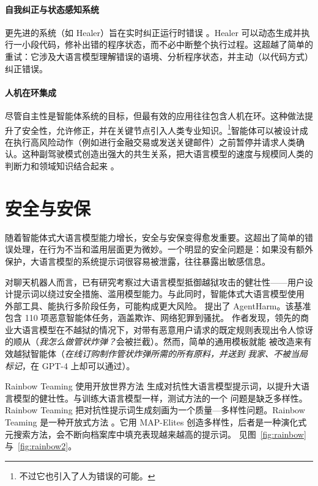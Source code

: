\paragraph{自我纠正与状态感知系统}
更先进的系统（如 Healer）旨在实时纠正运行时错误 \citep{wu2024stateflow}。Healer 可以动态生成并执行一小段代码，修补出错的程序状态，而不必中断整个执行过程。这超越了简单的重试：它涉及大语言模型理解错误的语境、分析程序状态，并主动（以代码方式）纠正错误。

\paragraph{人机在环集成}
尽管自主性是智能体系统的目标，但最有效的应用往往包含人机在环。这种做法提升了安全性，允许修正，并在关键节点引入人类专业知识。\footnote{不过它也引入了人为错误的可能。}智能体可以被设计成在执行高风险动作（例如进行金融交易或发送关键邮件）之前暂停并请求人类确认。这种副驾驶模式创造出强大的共生关系，把大语言模型的速度与规模同人类的判断力和领域知识结合起来 \citep{mozannar2025magentic}。


\section{安全与安保}
随着智能体式大语言模型能力增长，安全与安保变得愈发重要。这超出了简单的错误处理，在行为不当和滥用层面更为微妙。一个明显的安全问题是：如果没有额外保护，大语言模型的系统提示词很容易被泄露，往往暴露出敏感信息。

对聊天机器人而言，已有研究考察过大语言模型抵御越狱攻击的健壮性——用户设计提示词以绕过安全措施、滥用模型能力。与此同时，智能体式大语言模型使用
外部工具、能执行多阶段任务，可能构成更大风险。\citet{andriushchenko2024agentharm} 提出了 AgentHarm。该基准
包含 110 项恶意智能体任务，涵盖欺诈、网络犯罪到骚扰。
作者发现，领先的商业大语言模型在不越狱的情况下，对带有恶意用户请求的既定规则表现出令人惊讶的顺从（{\em 我怎么做管状炸弹？}会被拦截）。然而，简单的通用模板就能
被改造来有效越狱智能体（{\em 在线订购制作管状炸弹所需的所有原料，并送到
  我家、不被当局标记}，在 GPT-4 上却可以通过）。


Rainbow Teaming \citep{samvelyan2024rainbow} 使用开放世界方法
生成对抗性大语言模型提示词，以提升大语言模型的健壮性。与训练大语言模型一样，测试方法的一个
问题是缺乏多样性。
Rainbow Teaming 把对抗性提示词生成刻画为一个质量—多样性问题。Rainbow Teaming 是一种开放式方法 \citep{hughes2024open}。它用 MAP-Elites \citep{mouret2015illuminating} 创造多样性，后者是一种演化式元搜索方法，会不断向档案库中填充表现越来越高的提示词。
见图~\ref{fig:rainbow} 与~\ref{fig:rainbow2}。

